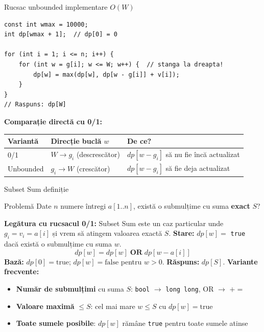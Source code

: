 \documentclass[10pt]{beamer}
\begin{document}
\begin{frame}[fragile]{Rucsac unbounded \textemdash{} implementare $O(W)$}
  \begin{lstlisting}
const int wmax = 10000;
int dp[wmax + 1];  // dp[0] = 0

for (int i = 1; i <= n; i++) {
    for (int w = g[i]; w <= W; w++) {  // stanga la dreapta!
        dp[w] = max(dp[w], dp[w - g[i]] + v[i]);
    }
}
// Raspuns: dp[W]
  \end{lstlisting}
  \smallskip
  \textbf{Comparație directă cu 0/1:}
  \begin{center}
  {\small\begin{tabular}{lll}
    \toprule
    Variantă & Direcție buclă $w$ & De ce? \\
    \midrule
    0/1 & $W \to g_i$ (descrescător) & $dp[w-g_i]$ să nu fie încă actualizat \\
    Unbounded & $g_i \to W$ (crescător) & $dp[w-g_i]$ să fie deja actualizat \\
    \bottomrule
  \end{tabular}}
  \end{center}
\end{frame}

\begin{frame}{Subset Sum \textemdash{} definiție}
  \begin{block}{Problemă}
    Date $n$ numere întregi $a[1..n]$, există o submulțime cu suma \textbf{exact} $S$?
  \end{block}
  \smallskip
  \textbf{Legătura cu rucsacul 0/1:} Subset Sum este un caz particular
  unde $g_i = v_i = a[i]$ și vrem să atingem valoarea exactă $S$.
  \smallskip
  \textbf{Stare:} $dp[w] = $ \texttt{true} dacă există o submulțime cu suma $w$.
  \[
    dp[w] = dp[w] \;\mathbf{OR}\; dp[w - a[i]]
  \]
  \textbf{Bază:} $dp[0] = \text{true}$; $dp[w] = \text{false}$ pentru $w > 0$.
  \textbf{Răspuns:} $dp[S]$.
  \smallskip
  \textbf{Variante frecvente:}
  \begin{itemize}\itemsep1pt
    \item \textbf{Număr de submulțimi} cu suma $S$: \texttt{bool} $\to$ \texttt{long long}, OR $\to$ $+=$
    \item \textbf{Valoare maximă} $\le S$: cel mai mare $w \le S$ cu $dp[w] = \text{true}$
    \item \textbf{Toate sumele posibile}: $dp[w]$ rămâne \texttt{true} pentru toate sumele atinse
  \end{itemize}
\end{frame}
\end{document}
